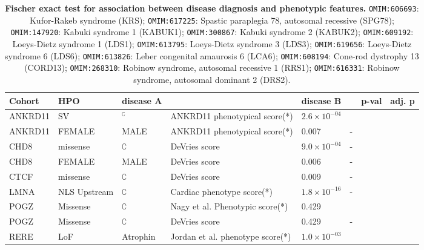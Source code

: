 \begin{table}
\centering
\begin{scriptsize}
\begin{tabular}{l>{\raggedright}p{2.5cm}llllrr}
\toprule
\textbf{Cohort} & \textbf{HPO} & \textbf{disease A} & \textbf{} & \textbf{disease B} & \textbf{} & \textbf{p-val} & \textbf{adj. p}\\
\midrule
ANKRD11 & SV & $^{\complement}$ & ANKRD11 phenotypical score(*) & $2.6 \times 10^{-04}$ & \cite{PMID_36446582}\\
ANKRD11 & FEMALE & MALE & ANKRD11 phenotypical score(*) & 0.007 & -\\
CHD8 & missense & $\complement$ & DeVries score & $9.0 \times 10^{-04}$ & -\\
CHD8 & FEMALE & MALE & DeVries score & 0.006 & -\\
CTCF & missense & $\complement$ & DeVries score & 0.009 & -\\
LMNA & NLS Upstream & $\complement$ & Cardiac phenotype score(*)& $1.8 \times 10^{-16}$ & -\\
POGZ & Missense & $\complement$ &  Nagy et al. Phenotypic  score(*)  & 0.429 & \cite{PMID_35052493}\\
POGZ & Missense & $\complement$ &  DeVries score & 0.429 & -\\
RERE & LoF & Atrophin & Jordan et al.  phenotype score(*)  & $1.0 \times 10^{-03}$ & \cite{PMID_29330883}\\
\bottomrule
\end{tabular}
\end{scriptsize}
\caption{\textbf{Fischer exact test for association between disease diagnosis and phenotypic features.}
\texttt{OMIM:606693}: Kufor-Rakeb syndrome (KRS);
 \texttt{OMIM:617225}: Spastic paraplegia 78, autosomal recessive (SPG78);
 \texttt{OMIM:147920}: Kabuki syndrome 1 (KABUK1);
 \texttt{OMIM:300867}: Kabuki syndrome 2 (KABUK2);
 \texttt{OMIM:609192}: Loeys-Dietz syndrome 1 (LDS1);
 \texttt{OMIM:613795}: Loeys-Dietz syndrome 3 (LDS3);
 \texttt{OMIM:619656}: Loeys-Dietz syndrome 6 (LDS6);
 \texttt{OMIM:613826}: Leber congenital amaurosis 6 (LCA6);
 \texttt{OMIM:608194}: Cone-rod dystrophy 13 (CORD13);
 \texttt{OMIM:268310}: Robinow syndrome, autosomal recessive 1 (RRS1);
 \texttt{OMIM:616331}: Robinow syndrome, autosomal dominant 2 (DRS2).
}
\label{tab:disease_dx}
\end{table}



\clearpage
\newpage

